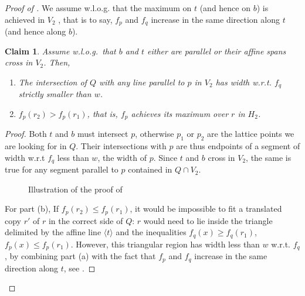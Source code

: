 \documentclass{amsart}
\theoremstyle{plain}
\newtheorem{claim}[theorem]{Claim}
\theoremstyle{definition}
\newcommand{\giulia}[1]{\todo[size=\tiny,color=blue!30]{#1 \\ \hfill --- G.}}
\begin{document}
\begin{proof}[Proof of ]
% 
%
%
%





We assume w.l.o.g. that the maximum on $t$ (and hence on $b$) is achieved in $V_2$ \giulia{do we need it??}, that is to say, $f_p$ and $f_q$ increase in the same direction along $t$ (and hence along $b$). 

\begin{claim}
\label{claim:r}
Assume w.l.o.g.~that $b$ and $t$ either are parallel or their affine spans cross in $V_2$. Then, 
\begin{enumerate}
\item The intersection of $Q$ with any line parallel to $p$ in $V_2$ has width w.r.t. $f_q$ strictly smaller than $w$.
\item $f_p(r_2) > f_p(r_1)$, that is, $f_p$ achieves its maximum over $r$ in $H_2$.
\end{enumerate}
\end{claim}

\begin{proof}
Both $t$ and $b$ must intersect $p$, otherwise $p_1$ or $p_2$ are the lattice points we are looking for in $Q$.  Their intersections with $p$ are thus endpoints of a segment of width w.r.t $f_q$ less than $w$, the width of $p$. Since $t$ and $b$ cross in $V_2$, the same is true for any segment parallel to $p$ contained in $Q \cap V_2$.  

\begin{figure}[htb]
\scalebox{.75}{}
\caption{Illustration of the proof of }
\label{fig:claim3}
\end{figure}

For part (b), If $f_p(r_2) \leq f_p(r_1)$, it would be impossible to fit a translated copy $r'$ of $r$ in the correct side of $Q$: $r$ would need to lie inside the triangle delimited by the affine line $\langle t \rangle$ and the inequalities $f_q(x) \geq f_q(r_1)$, $f_p(x) \leq f_p(r_1)$. However, this triangular region has width less than $w$  w.r.t. $f_q$, by combining part (a) with the fact that $f_p$ and $f_q$ increase in the same direction along $t$, see . 
\end{proof}


\end{proof}
\end{document}
